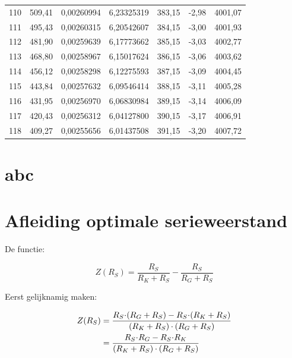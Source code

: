 \documentclass[12pt,a4paper,final,twoside,fleqn]{article}
\let\oldcdot\cdot
\renewcommand{\cdot}{\kern-.10em\oldcdot\kern-.10em}
\newcommand{\cdotw}{\kern.08em\oldcdot\kern.08em}
\begin{document}
\begin{ThreePartTable}
\begin{longtable}{rrrrrrr}
110          & 509,41    & 0,00260994    & 6,23325319  & 383,15     & -2,98      & 4001,07 \\
111          & 495,43    & 0,00260315    & 6,20542607  & 384,15     & -3,00      & 4001,93 \\
112          & 481,90    & 0,00259639    & 6,17773662  & 385,15     & -3,03      & 4002,77 \\
113          & 468,80    & 0,00258967    & 6,15017624  & 386,15     & -3,06      & 4003,62 \\
114          & 456,12    & 0,00258298    & 6,12275593  & 387,15     & -3,09      & 4004,45 \\
115          & 443,84    & 0,00257632    & 6,09546414  & 388,15     & -3,11      & 4005,28 \\
116          & 431,95    & 0,00256970    & 6,06830984  & 389,15     & -3,14      & 4006,09 \\
117          & 420,43    & 0,00256312    & 6,04127800  & 390,15     & -3,17      & 4006,91 \\
118          & 409,27    & 0,00255656    & 6,01437508  & 391,15     & -3,20      & 4007,72 \\
\end{longtable}
\end{ThreePartTable}

\clearpage
\section{abc}
\label{app:ntc_shh_kelvin}

\newpage
\label{app:ntc_shh_straightline_beta}

\newpage
\label{app:ntc_shh_straightline_adapt}



\clearpage
\section{Afleiding optimale serieweerstand}
\label{app:afleiding}
De functie:

\begin{equation}
Z(R_S) = \dfrac{R_S}{R_K+R_S}-\dfrac{R_S}{R_G+R_S}
\end{equation}

Eerst gelijknamig maken:

\begin{equation}
\begin{split}
Z(R_S) &= \dfrac{R_S\cdot(R_G+R_S)-R_S\cdot(R_K+R_S)}{(R_K+R_S)\cdotw(R_G+R_S)} \\
       &= \dfrac{R_S\cdot R_G - R_S\cdot R_K}{(R_K+R_S)\cdotw(R_G+R_S)}
\end{split}
\end{equation}
\end{document}
